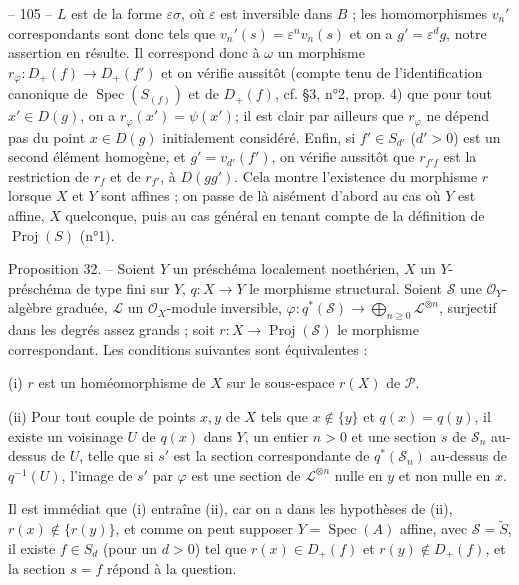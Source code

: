 \newpage


-- 105 --
$L$ est de la forme $\varepsilon \sigma$, où $\varepsilon$ est inversible dans $B$ ; les homomorphismes $v_n'$ correspondants sont donc tels que $v_n'(s) = \varepsilon^n v_n(s)$ et on a $g' = \varepsilon^d g$, notre assertion en résulte. Il correspond donc à $\omega$ un morphisme $r_\varphi : D_+(f) \to D_+(f')$ et on vérifie aussitôt (compte tenu de l'identification canonique de $\operatorname{Spec}(S_{(f)})$ et de $D_+(f)$, cf. §3, n°2, prop. 4) que pour tout $x' \in D(g)$, on a $r_\varphi(x') = \psi(x')$; il est clair par ailleurs que $r_\varphi$ ne dépend pas du point $x \in D(g)$ initialement considéré. Enfin, si $f' \in S_{d'}$ ($d' > 0$) est un second élément homogène, et $g' = v_{d'}(f')$, on vérifie aussitôt que $r_{f'f}$ est la restriction de $r_f$ et de $r_{f'}$, à $D(gg')$. Cela montre l'existence du morphisme $r$ lorsque $X$ et $Y$ sont affines ; on passe de là aisément d'abord au cas où $Y$ est affine, $X$ quelconque, puis au cas général en tenant compte de la définition de $\operatorname{Proj}(S)$ (n°1).

Proposition 32. -- Soient $Y$ un préschéma localement noethérien, $X$ un $Y$-préschéma de type fini sur $Y$, $q : X \to Y$ le morphisme structural. Soient $\mathcal{S}$ une $\mathcal{O}_Y$-algèbre graduée, $\mathcal{L}$ un $\mathcal{O}_X$-module inversible, $\varphi : q^*(\mathcal{S}) \to \bigoplus_{n \geqslant 0} \mathcal{L}^{\otimes n}$, surjectif dans les degrés assez grands ; soit $r : X \to \operatorname{Proj}(\mathcal{S})$ le morphisme correspondant. Les conditions suivantes sont équivalentes :

(i) $r$ est un homéomorphisme de $X$ sur le sous-espace $r(X)$ de $\mathcal{P}$.

(ii) Pour tout couple de points $x, y$ de $X$ tels que $x \notin \{y\}$ et $q(x) = q(y)$, il existe un voisinage $U$ de $q(x)$ dans $Y$, un entier $n > 0$ et une section $s$ de $\mathcal{S}_n$ au-dessus de $U$, telle que si $s'$ est la section correspondante de $q^*(\mathcal{S}_n)$ au-dessus de $q^{-1}(U)$, l'image de $s'$ par $\varphi$ est une section de $\mathcal{L}^{\otimes n}$ nulle en $y$ et non nulle en $x$.

Il est immédiat que (i) entraîne (ii), car on a dans les hypothèses de (ii), $r(x) \notin \{r(y)\}$, et comme on peut supposer $Y = \operatorname{Spec}(A)$ affine, avec $\mathcal{S} = \tilde{S}$, il existe $f \in S_d$ (pour un $d > 0$) tel que $r(x) \in D_+(f)$ et $r(y) \notin D_+(f)$, et la section $s = f$ répond à la question.

